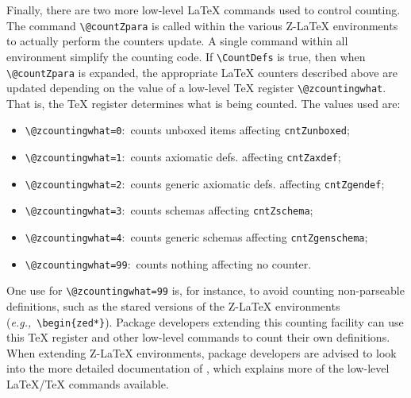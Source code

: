 \documentclass{article}
\begin{document}
Finally, there are two more low-level \LaTeX{} commands used to control counting. The
command \verb|\@countZpara| is called within the various Z-\LaTeX{} environments to
actually perform the counters update. A single command within all environment simplify
the counting code. If \verb|\CountDefs| is true, then when \verb|\@countZpara| is expanded,
the appropriate \LaTeX{} counters described above are updated depending on the value of a 
low-level \TeX{} register \verb|\@zcountingwhat|. That is, the \TeX{} register determines 
what is being counted. The values used are:
%
\begin{itemize}
   \item \verb|\@zcountingwhat=0|:~counts unboxed items affecting \texttt{cntZunboxed};
   \item \verb|\@zcountingwhat=1|:~counts axiomatic defs. affecting \texttt{cntZaxdef};
   \item \verb|\@zcountingwhat=2|:~counts generic axiomatic defs. affecting \texttt{cntZgendef};
   \item \verb|\@zcountingwhat=3|:~counts schemas affecting \texttt{cntZschema};
   \item \verb|\@zcountingwhat=4|:~counts generic schemas affecting \texttt{cntZgenschema};
   \item \verb|\@zcountingwhat=99|:~counts nothing affecting no counter.
\end{itemize}
%
One use for \verb|\@zcountingwhat=99| is, for instance, to avoid counting non-parseable
definitions, such as the stared versions of the Z-\LaTeX{} environments (\textit{e.g.,}~\verb|\begin{zed*}|).
Package developers extending this counting facility can use this \TeX{} register and
other low-level commands to count their own definitions. When extending Z-\LaTeX{} environments,
package developers are advised to look into the more detailed documentation of \cztstylefile, 
which explains more of the low-level \LaTeX/\TeX{} commands available.
\end{document}
